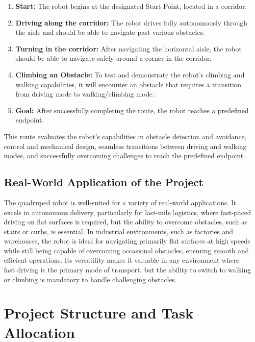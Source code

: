 \documentclass{article}
\begin{document}
\begin{enumerate}
    \item \textbf{Start:} The robot begins at the designated Start Point, located in a corridor.
    \item \textbf{Driving along the corridor:} The robot drives fully autonomously through the aisle and should be able to navigate past various obstacles.
    \item \textbf{Turning in the corridor:} After navigating the horizontal aisle, the robot should be able to navigate safely around a corner in the corridor.
    \item \textbf{Climbing an Obstacle:} To test and demonstrate the robot's climbing and walking capabilities, it will encounter an obstacle that requires a transition from driving mode to walking/climbing mode.
    \item \textbf{Goal:} After successfully completing the route, the robot reaches a predefined endpoint.
\end{enumerate}

This route evaluates the robot's capabilities in obstacle detection and avoidance, control and mechanical design, seamless transitions between driving and walking modes, and successfully overcoming challenges to reach the predefined endpoint.

\subsection{Real-World Application of the Project}

The quadruped robot is well-suited for a variety of real-world applications. It excels in autonomous delivery, particularly for last-mile logistics, where fast-paced driving on flat surfaces is required, but the ability to overcome obstacles, such as stairs or curbs, is essential. In industrial environments, such as factories and warehouses, the robot is ideal for navigating primarily flat surfaces at high speeds while still being capable of overcoming occasional obstacles, ensuring smooth and efficient operations. Its versatility makes it valuable in any environment where fast driving is the primary mode of transport, but the ability to switch to walking or climbing is mandatory to handle challenging obstacles.

\section{Project Structure and Task Allocation}
\end{document}

